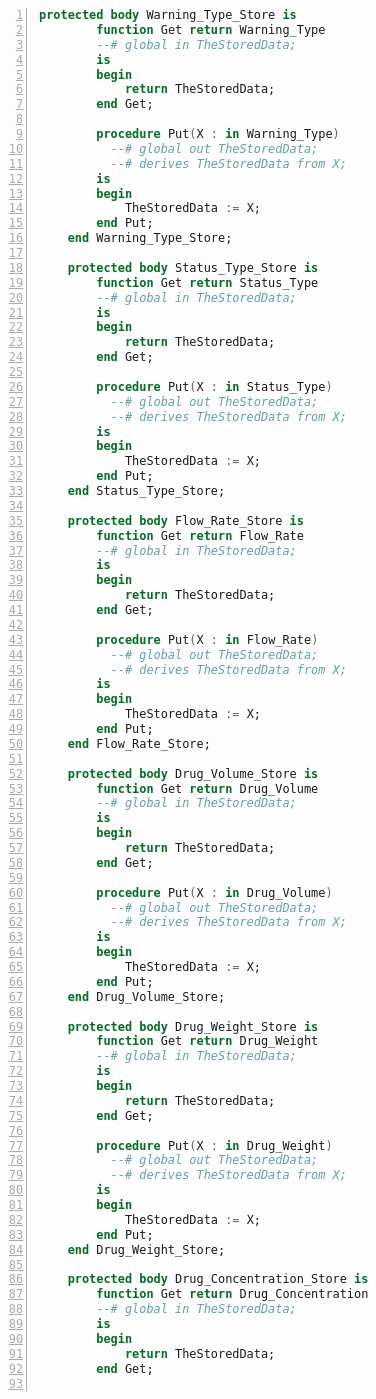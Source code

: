 \begin{lstlisting}[language=ada, gobble=0, numbers=left, caption={\lstinline{Pca_Types} package}]
    protected body Warning_Type_Store is
        function Get return Warning_Type
        --# global in TheStoredData;
        is
        begin
            return TheStoredData;
        end Get;

        procedure Put(X : in Warning_Type)
          --# global out TheStoredData;
          --# derives TheStoredData from X;
        is
        begin
            TheStoredData := X;
        end Put;
    end Warning_Type_Store;

    protected body Status_Type_Store is
        function Get return Status_Type
        --# global in TheStoredData;
        is
        begin
            return TheStoredData;
        end Get;

        procedure Put(X : in Status_Type)
          --# global out TheStoredData;
          --# derives TheStoredData from X;
        is
        begin
            TheStoredData := X;
        end Put;
    end Status_Type_Store;

    protected body Flow_Rate_Store is
        function Get return Flow_Rate
        --# global in TheStoredData;
        is
        begin
            return TheStoredData;
        end Get;

        procedure Put(X : in Flow_Rate)
          --# global out TheStoredData;
          --# derives TheStoredData from X;
        is
        begin
            TheStoredData := X;
        end Put;
    end Flow_Rate_Store;

    protected body Drug_Volume_Store is
        function Get return Drug_Volume
        --# global in TheStoredData;
        is
        begin
            return TheStoredData;
        end Get;

        procedure Put(X : in Drug_Volume)
          --# global out TheStoredData;
          --# derives TheStoredData from X;
        is
        begin
            TheStoredData := X;
        end Put;
    end Drug_Volume_Store;

    protected body Drug_Weight_Store is
        function Get return Drug_Weight
        --# global in TheStoredData;
        is
        begin
            return TheStoredData;
        end Get;

        procedure Put(X : in Drug_Weight)
          --# global out TheStoredData;
          --# derives TheStoredData from X;
        is
        begin
            TheStoredData := X;
        end Put;
    end Drug_Weight_Store;

    protected body Drug_Concentration_Store is
        function Get return Drug_Concentration
        --# global in TheStoredData;
        is
        begin
            return TheStoredData;
        end Get;


\end{lstlisting}
